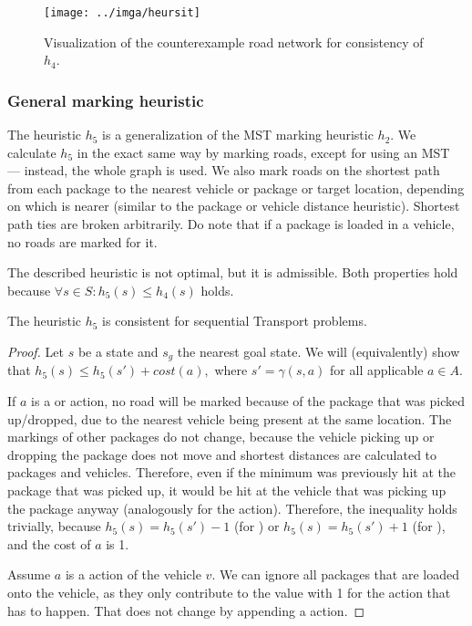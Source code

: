 \begin{figure}[tb]
\centering
\texttt{[image: ../imga/heursit]}
\caption{Visualization of the counterexample road network
for consistency of $h_4$.}
\label{fig:heursit}
\end{figure}

\subsubsection{General marking heuristic}\label{sfa5}

The heuristic $h_5$ is a generalization of the MST marking heuristic $h_2$. We calculate $h_5$ in the exact same way by marking roads,
except for
using an MST --- instead, the whole graph is used.
We also mark roads on the shortest path from each package to the nearest
vehicle or package or target location, depending on which is nearer (similar
to the package or vehicle distance heuristic).
Shortest path ties are broken arbitrarily.
Do note that if a package is loaded in a vehicle, no roads are marked for it.

The described heuristic is not optimal, but it is admissible.
Both properties hold because $\forall s \in S : h_5(s) \leq h_4(s)$ holds.

\begin{thm}
The heuristic $h_5$ is consistent for sequential Transport problems.
\end{thm}
\begin{proof}
Let $s$ be a state and $s_g$ the nearest goal state.
We will (equivalently) show that $h_5(s) \leq h_5(s') + cost(a),$ where
$s' = \gamma(s, a)$ for all applicable $a \in A$.

If $a$ is a \pickup{} or \drop{} action,
no road will be marked because of the package that was picked up/dropped,
due to the nearest vehicle being present at the same location.
The markings of other packages do not change, because
the vehicle picking up or dropping the package does not move
and shortest distances are calculated to packages and vehicles.
Therefore, even if the minimum was previously hit at the package that was
picked up, it would be hit at the vehicle that was picking up
the package anyway (analogously for the \drop{} action).
Therefore, the inequality holds trivially, because $h_5(s) = h_5(s') - 1$ (for \drop{})
or $h_5(s) = h_5(s') + 1$ (for \pickup{}), and the cost of $a$ is 1.

Assume $a$ is a \drive{} action of the vehicle $v$.
We can ignore all packages that are loaded onto the vehicle,
as they only contribute to the value with 1 for the \drop{} action
that has to happen. That does not change by appending a \drive{} action.
\end{proof}


